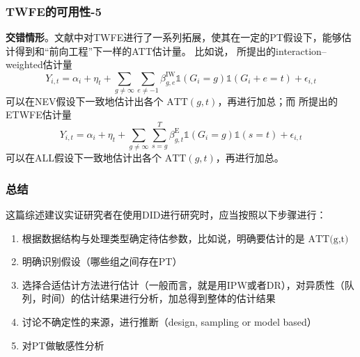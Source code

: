 \documentclass[../didNotes.tex]{subfiles}
\begin{document}
\begin{frame}
  \frametitle{TWFE的可用性-5}

  \textbf{交错情形}。文献中对TWFE进行了一系列拓展，使其在一定的PT假设下，能够估计得到和``前向工程''下一样的ATT估计量。
  比如说，\textcite{sun2021} 所提出的interaction--weighted估计量
  $$
  Y_{i,t} = \alpha_{i} + \eta_{t} + \sum_{g \neq \infty} \sum_{e \neq -1} \beta_{g,e}^{\text{IW}} \mathbb{1} (G_{i}=g)
  \mathbb{1}(G_{i}+e=t) + \epsilon_{i,t}
  $$
  可以在NEV假设下一致地估计出各个 $\text{ATT}(g,t)$，再进行加总；而 \textcite{wooldridge2021} 所提出的ETWFE估计量
  $$
  Y_{i,t} = \alpha_{i} + \eta_{t} + \sum_{g \neq \infty} \sum_{s = g}^{T} \beta_{g,t}^{\text{E}} \mathbb{1} (G_{i}=g)
  \mathbb{1}(s=t) + \epsilon_{i,t}
  $$
  可以在ALL假设下一致地估计出各个 $\text{ATT}(g,t)$，再进行加总。

\end{frame}

\begin{frame}
  \frametitle{总结}

  这篇综述建议实证研究者在使用DID进行研究时，应当按照以下步骤进行：
  \begin{enumerate}
    \item 根据数据结构与处理类型确定待估参数，比如说，明确要估计的是 $\text{ATT(g,t)}$
    \item 明确识别假设（哪些组之间存在PT）
    \item 选择合适估计方法进行估计（一般而言，就是用IPW或者DR），对异质性（队列，时间）的估计结果进行分析，加总得到整体的估计结果
    \item 讨论不确定性的来源，进行推断（design, sampling or model based）
    \item 对PT做敏感性分析
  \end{enumerate}

\end{frame}
\end{document}
